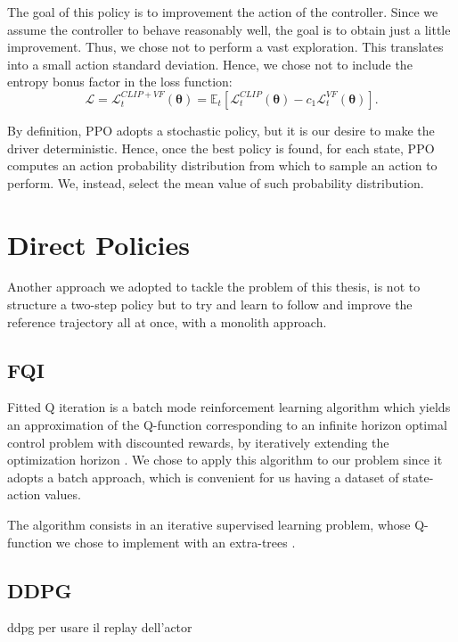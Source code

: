 The goal of this policy is to improvement the action of the controller. Since we assume the controller to behave reasonably well, the goal is to obtain just a little improvement. Thus, we chose not to perform a vast exploration. This translates into a small action standard deviation. Hence, we chose not to include the entropy bonus factor in the loss function:
\begin{equation}
    \mathcal{L} = \mathcal{L}_t^{CLIP+VF}(\boldsymbol \theta) = \mathbb{E}_t\left[\mathcal{L}^{CLIP}_t(\boldsymbol \theta) -c_1 \mathcal{L}_t^{VF}(\boldsymbol \theta)\right].
\end{equation}

By definition, PPO adopts a stochastic policy, but it is our desire to make the driver deterministic.
Hence, once the best policy is found, for each state, PPO computes an action probability distribution from which to sample an action to perform. We, instead, select the mean value of such probability distribution.

\section{Direct Policies}
Another approach we adopted to tackle the problem of this thesis, is not to structure a two-step policy but to try and learn to follow and improve the reference trajectory all at once, with a monolith approach.
\subsection{FQI}
Fitted Q iteration is a batch mode reinforcement learning algorithm which yields an approximation of the Q-function corresponding to an infinite horizon optimal control problem with discounted rewards, by iteratively extending the optimization horizon \cite{fqi}.
We chose to apply this algorithm to our problem since it adopts a batch approach, which is convenient for us having a dataset of state-action values.

The algorithm consists in an iterative supervised learning problem, whose Q-function we chose to implement with an extra-trees \cite{extratrees}.

\subsection{DDPG}
ddpg per usare il replay dell'actor

